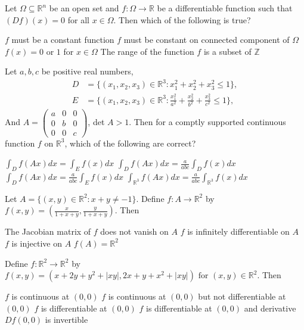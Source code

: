 \documentclass[10pt]{exam}
\newcommand{\R}{\ensuremath{\mathbb{R}}}
\begin{document}
\begin{questions}
\question 
Let $\Omega \subseteq \mathbb{R}^n$ be an open set and $f : \Omega \rightarrow \mathbb{R}$ be a differentiable function such that $(Df)(x) = 0$ for all $x \in \Omega$. Then which of the following is true?

\begin{choices}
\choice $f$ must be a constant function
\choice $f$ must be constant on connected component of $\Omega$
\choice $f(x) = 0$ or $1$ for $x \in \Omega$
\choice The range of the function $f$ is a subset of $\mathbb{Z}$
\end{choices}

\question 
Let $a, b, c$ be positive real numbers, 
\begin{align*}
D & = \{(x_1, x_2, x_3) \in \R^3: x_1^2 + x_2^2 + x_3^2 \leq 1\}, \\
E & = \{(x_1, x_2, x_3) \in \R^3: \frac{x_1^2}{a^2} + \frac{x_2^2}{b^2} + \frac{x_3^2}{c^2} \leq 1\} ,
\end{align*}
And $A = \begin{pmatrix} a & 0 & 0 \\ 0 & b & 0 \\ 0 & 0 & c \end{pmatrix}$, det $A>1$. Then for a comptly supported continuous function $f$ on $\R^3$, which of the following are correct?

\begin{checkboxes}
\choice $\int_D f(Ax) dx = \int_E f(x) dx $
\choice $\int_D f(Ax) dx = \frac{a}{abc} \int_D f(x) dx $
\choice $\int_D f(Ax) dx = \frac{a}{abc} \int_E f(x) dx $
\choice $\int_{\R^3} f(Ax) dx = \frac{a}{abc} \int_{\R^3} f(x) dx $
\end{checkboxes} 

\question 
Let $A = \{(x,y)\in \R^2 : x+y \neq -1 \}$. Define $f:A \rightarrow \R^2$ by $f(x,y) = \left ( \frac{x}{1 + x +y}, \frac{y}{1 + x +y}\right )$. Then 

\begin{checkboxes}
\choice The Jacobian matrix of $f$ does not vanish on $A$ 
\choice $f$ is infinitely differentiable on $A$ 
\choice $f$ is injective on $A$
\choice $f(A) = \R^2$ 
\end{checkboxes}

\question 
Define $f:\R^2 \rightarrow \R^2$ by $f(x,y) = (x + 2y + y^2 + |xy|,2x + y + x^2 + |xy| ) \text{ for } (x,y ) \in \R^2.$
Then 

\begin{checkboxes}
\choice $f$ is continuous     at $(0,0)$
\choice $f$ is continuous     at $(0,0)$ but not differentiable at $(0,0)$
\choice $f$ is differentiable at $(0,0)$
\choice $f$ is differentiable at $(0,0)$ and derivative $Df(0,0)$ is invertible
\end{checkboxes}


\end{questions}
\end{document}
